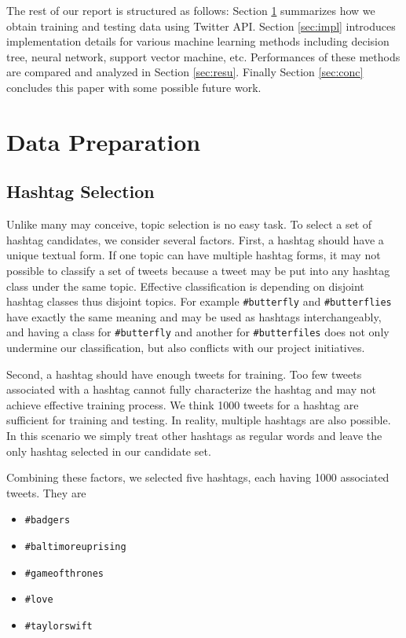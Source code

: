 \documentclass[letterpaper,11pt,twocolumn]{article}
\begin{document}
The rest of our report is structured as follows: Section \ref{sec:data} summarizes how we obtain training and testing data using Twitter API. Section \ref{sec:impl} introduces implementation details for various machine learning methods including decision tree, neural network, support vector machine, etc. Performances of these methods are compared and analyzed in Section \ref{sec:resu}. Finally Section \ref{sec:conc} concludes this paper with some possible future work.

\section{Data Preparation}
\label{sec:data}

\subsection{Hashtag Selection}
Unlike many may conceive, topic selection is no easy task. To select a set of hashtag candidates, we consider several factors. First, a hashtag should have a unique textual form. If one topic can have multiple hashtag forms, it may not possible to classify a set of tweets because a tweet may be put into any hashtag class under the same topic. Effective classification is depending on disjoint hashtag classes thus disjoint topics. For example \texttt{\#butterfly} and \texttt{\#butterflies} have exactly the same meaning and may be used as hashtags interchangeably, and having a class for \texttt{\#butterfly} and another for \texttt{\#butterfiles} does not only undermine our classification, but also conflicts with our project initiatives.

Second, a hashtag should have enough tweets for training. Too few tweets associated with a hashtag cannot fully characterize the hashtag and may not achieve effective training process. We think 1000 tweets for a hashtag are sufficient for training and testing. In reality, multiple hashtags are also possible. In this scenario we simply treat other hashtags as regular words and leave the only hashtag selected in our candidate set.

Combining these factors, we selected five hashtags, each having 1000 associated tweets. They are
\begin{itemize}
\item
\texttt{\#badgers}
\item
\texttt{\#baltimoreuprising}
\item
\texttt{\#gameofthrones}
\item
\texttt{\#love}
\item
\texttt{\#taylorswift}
\end{itemize}
\end{document}
